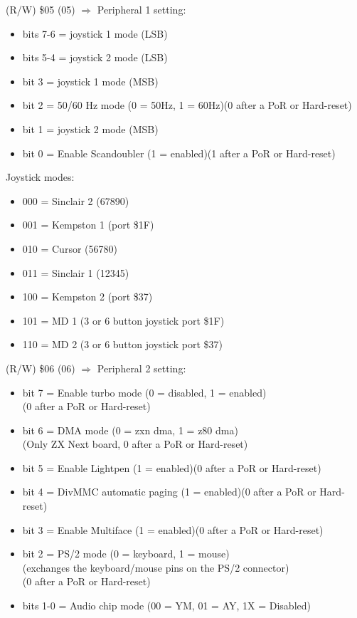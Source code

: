 (R/W) \$05 (05) $\Rightarrow$ Peripheral 1 setting:
\begin{itemize}
\item[] bits 7-6 = joystick 1 mode (LSB)
\item[] bits 5-4 = joystick 2 mode (LSB)
\item[] bit 3 = joystick 1 mode (MSB)
\item[] bit 2 = 50/60 Hz mode (0 = 50Hz, 1 = 60Hz)(0 after a PoR or Hard-reset)
\item[] bit 1 = joystick 2 mode (MSB)
\item[] bit 0 = Enable Scandoubler (1 = enabled)(1 after a PoR or Hard-reset)
\end{itemize}
Joystick modes:
\begin{itemize}
\item[] 000 = Sinclair 2 (67890)
\item[] 001 = Kempston 1 (port \$1F)
\item[] 010 = Cursor (56780)
\item[] 011 = Sinclair 1 (12345)
\item[] 100 = Kempston 2 (port \$37)
\item[] 101 = MD 1 (3 or 6 button joystick port \$1F)
\item[] 110 = MD 2 (3 or 6 button joystick port \$37)
\end{itemize}

(R/W) \$06 (06) $\Rightarrow$ Peripheral 2 setting:
\begin{itemize}
\item[] bit 7 = Enable turbo mode (0 = disabled, 1 = enabled)\\
  (0 after a PoR or Hard-reset)
\item[] bit 6 = DMA mode (0 = zxn dma, 1 = z80 dma)\\
  (Only ZX Next board, 0 after a PoR or Hard-reset)
\item[] bit 5 = Enable Lightpen (1 = enabled)(0 after a PoR or Hard-reset)
\item[] bit 4 = DivMMC automatic paging (1 = enabled)(0 after a PoR or
  Hard-reset)
\item[] bit 3 = Enable Multiface (1 = enabled)(0 after a PoR or Hard-reset)
\item[] bit 2 = PS/2 mode (0 = keyboard, 1 = mouse)\\
  (exchanges the keyboard/mouse pins on the PS/2 connector)\\
  (0 after a PoR or Hard-reset)
\item[] bits 1-0 = Audio chip mode (00 = YM, 01 = AY, 1X = Disabled)
\end{itemize}

